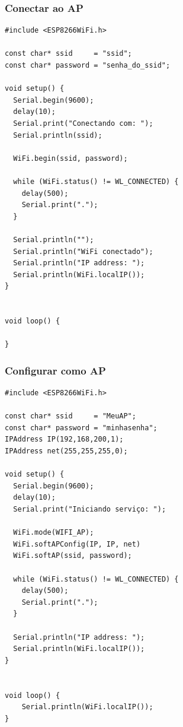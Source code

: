 \documentclass{beamer}
\begin{document}
\begin{frame}[fragile]
\frametitle{Conectar ao AP}

\tiny
\begin{lstlisting}
#include <ESP8266WiFi.h>

const char* ssid     = "ssid";
const char* password = "senha_do_ssid";

void setup() {
  Serial.begin(9600);
  delay(10);
  Serial.print("Conectando com: ");
  Serial.println(ssid);
 
  WiFi.begin(ssid, password);

  while (WiFi.status() != WL_CONNECTED) {
    delay(500);
    Serial.print(".");
  }

  Serial.println("");
  Serial.println("WiFi conectado");  
  Serial.println("IP address: ");
  Serial.println(WiFi.localIP());
}


void loop() {

}
\end{lstlisting}

\end{frame}


\begin{frame}[fragile]
\frametitle{Configurar como AP}

\tiny
\begin{lstlisting}
#include <ESP8266WiFi.h>

const char* ssid     = "MeuAP";
const char* password = "minhasenha";
IPAddress IP(192,168,200,1);
IPAddress net(255,255,255,0);

void setup() {
  Serial.begin(9600);
  delay(10);
  Serial.print("Iniciando serviço: ");
  
  WiFi.mode(WIFI_AP); 
  WiFi.softAPConfig(IP, IP, net)
  WiFi.softAP(ssid, password);

  while (WiFi.status() != WL_CONNECTED) {
    delay(500);
    Serial.print(".");
  }

  Serial.println("IP address: ");
  Serial.println(WiFi.localIP());
}


void loop() {
    Serial.println(WiFi.localIP());
}
\end{lstlisting}

\end{frame}
\end{document}
